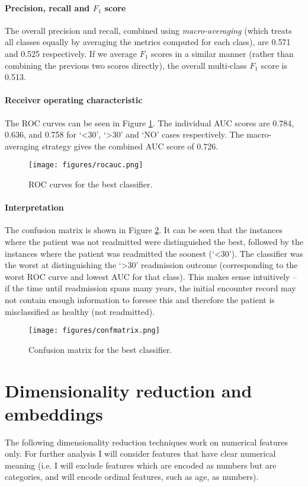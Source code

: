 \documentclass[10pt, twocolumn]{article}
\begin{document}
\paragraph{Precision, recall and $F_1$ score} The overall precision and recall, combined using \textit{macro-averaging} (which treats all classes equally by averaging the metrics computed for each class), are 0.571 and 0.525 respectively. If we average $F_1$ scores in a similar manner (rather than combining the previous two scores directly), the overall multi-class $F_1$ score is 0.513.

\paragraph{Receiver operating characteristic} The ROC curves can be seen in Figure \ref{rocauc}. The individual AUC scores are 0.784, 0.636, and 0.758 for ‘<30’, `>30' and `NO' cases respectively. The macro-averaging strategy gives the combined AUC score of 0.726.

\begin{figure}[htb!]
	\centering
	\texttt{[image: figures/rocauc.png]}
	\caption{ROC curves for the best classifier.}\label{rocauc}
\end{figure}

\paragraph{Interpretation} The confusion matrix is shown in Figure \ref{confmatrix}. It can be seen that the instances where the patient was not readmitted were distinguished the best, followed by the instances where the patient was readmitted the soonest (‘<30’). The classifier was the worst at distinguishing the ‘>30’ readmission outcome (corresponding to the worst ROC curve and lowest AUC for that class). This makes sense intuitively – if the time until readmission spans many years, the initial encounter record may not contain enough information to foresee this and therefore the patient is misclassified as healthy (not readmitted).

\begin{figure}[htb!]
	\centering
	\texttt{[image: figures/confmatrix.png]}
	\caption{Confusion matrix for the best classifier.}\label{confmatrix}
\end{figure}

\section{Dimensionality reduction and embeddings}
The following dimensionality reduction techniques work on numerical features only. For further analysis I will consider features that have clear numerical meaning (i.e. I will exclude features which are encoded as numbers but are categories, and will encode ordinal features, such as age, as numbers).
\end{document}
